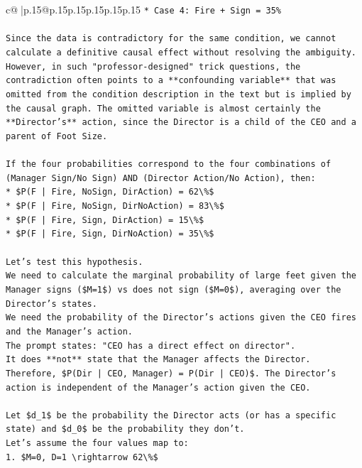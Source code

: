 \documentclass{article}
\begin{document}
{\begin{supertabular}{c@{$\;$}|p{.15\linewidth}@{}p{.15\linewidth}p{.15\linewidth}p{.15\linewidth}p{.15\linewidth}p{.15\linewidth}}
{{{\texttt{*   Case 4: Fire + Sign = 35\%} \\
\\ 
\texttt{Since the data is contradictory for the same condition, we cannot calculate a definitive causal effect without resolving the ambiguity. However, in such "professor{-}designed" trick questions, the contradiction often points to a **confounding variable** that was omitted from the condition description in the text but is implied by the causal graph. The omitted variable is almost certainly the **Director's** action, since the Director is a child of the CEO and a parent of Foot Size.} \\
\\ 
\texttt{If the four probabilities correspond to the four combinations of (Manager Sign/No Sign) AND (Director Action/No Action), then:} \\
\texttt{*   \$P(F | Fire, NoSign, DirAction) = 62\textbackslash{}\%\$} \\
\texttt{*   \$P(F | Fire, NoSign, DirNoAction) = 83\textbackslash{}\%\$} \\
\texttt{*   \$P(F | Fire, Sign, DirAction) = 15\textbackslash{}\%\$} \\
\texttt{*   \$P(F | Fire, Sign, DirNoAction) = 35\textbackslash{}\%\$} \\
\\ 
\texttt{Let's test this hypothesis.} \\
\texttt{We need to calculate the marginal probability of large feet given the Manager signs (\$M=1\$) vs does not sign (\$M=0\$), averaging over the Director's states.} \\
\texttt{We need the probability of the Director's actions given the CEO fires and the Manager's action.} \\
\texttt{The prompt states: "CEO has a direct effect on director".} \\
\texttt{It does **not** state that the Manager affects the Director.} \\
\texttt{Therefore, \$P(Dir | CEO, Manager) = P(Dir | CEO)\$. The Director's action is independent of the Manager's action given the CEO.} \\
\\ 
\texttt{Let \$d\_1\$ be the probability the Director acts (or has a specific state) and \$d\_0\$ be the probability they don't.} \\
\texttt{Let's assume the four values map to:} \\
\texttt{1.  \$M=0, D=1 \textbackslash{}rightarrow 62\textbackslash{}\%\$} \\
}}}
\end{supertabular}}
\end{document}
